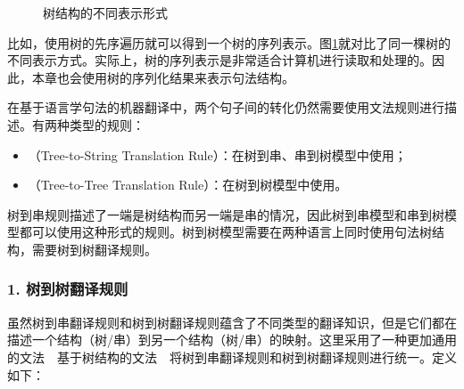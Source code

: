 \begin{figure}[htp]
\centering

\caption{树结构的不同表示形式}
\label{fig:8-18}
\end{figure}

\parinterval 比如，使用树的先序遍历就可以得到一个树的序列表示。图\ref{fig:8-18}就对比了同一棵树的不同表示方式。实际上，树的序列表示是非常适合计算机进行读取和处理的。因此，本章也会使用树的序列化结果来表示句法结构。

\parinterval 在基于语言学句法的机器翻译中，两个句子间的转化仍然需要使用文法规则进行描述。有两种类型的规则：

\begin{itemize}
\vspace{0.5em}
\item {\small{}}（Tree-to-String Translation Rule）：在树到串、串到树模型中使用；
\vspace{0.5em}
\item {\small{}}（Tree-to-Tree Translation Rule）：在树到树模型中使用。
\vspace{0.5em}
\end{itemize}

\parinterval 树到串规则描述了一端是树结构而另一端是串的情况，因此树到串模型和串到树模型都可以使用这种形式的规则。树到树模型需要在两种语言上同时使用句法树结构，需要树到树翻译规则。


\subsubsection{1. 树到树翻译规则}

\parinterval 虽然树到串翻译规则和树到树翻译规则蕴含了不同类型的翻译知识，但是它们都在描述一个结构（树/串）到另一个结构（树/串）的映射。这里采用了一种更加通用的文法\ \dash \ 基于树结构的文法\ \dash \ 将树到串翻译规则和树到树翻译规则进行统一。定义如下：

